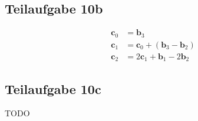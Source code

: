 \documentclass[a4paper]{scrartcl}
\begin{document}
\subsection*{Teilaufgabe 10b}
\begin{align*}
\mathbf{c}_0 &= \mathbf{b}_3\\
\mathbf{c}_1 &= \mathbf{c}_0 + (\mathbf{b}_3 - \mathbf{b}_2)\\
\mathbf{c}_2 &= 2\mathbf{c}_1 + \mathbf{b}_1 - 2 \mathbf{b}_2
\end{align*}

\subsection*{Teilaufgabe 10c}
TODO
\end{document}
